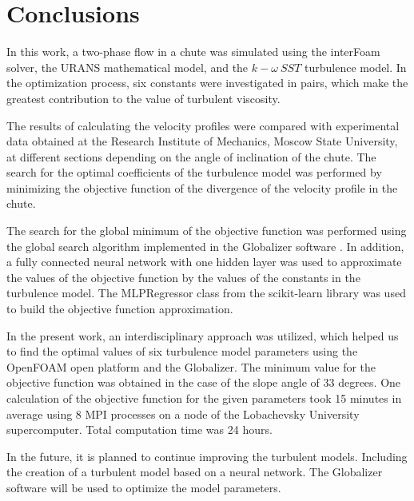 \documentclass[mathematics,article,submit,pdftex,moreauthors]{Definitions/mdpi}
\begin{document}
\section{Conclusions}

In this work, a two-phase flow in a chute was simulated using the interFoam solver, the URANS mathematical model, and the $k-\omega\ SST$ turbulence model. In the optimization process, six constants were investigated in pairs, which make the greatest contribution to the value of turbulent viscosity.

The results of calculating the velocity profiles were compared with experimental data obtained at the Research Institute of Mechanics, Moscow State University, at different sections depending on the angle of inclination of the chute. The search for the optimal coefficients of the turbulence model was performed by minimizing the objective function of the divergence of the velocity profile in the chute. %

The search for the global minimum of the objective function was performed using the global search algorithm implemented in the Globalizer software \cite{globalizerSystem}. In addition, a fully connected neural network with one hidden layer was used to approximate the values of the objective function by the values of the constants in the turbulence model. The MLPRegressor class from the scikit-learn library was used to build the objective function approximation. 

In the present work, an interdisciplinary approach was utilized, which helped us to find the optimal values of six turbulence model parameters using the OpenFOAM open platform and the Globalizer. The minimum value for the objective function was obtained in the case of the slope angle of 33 degrees. One calculation of the objective function for the given parameters took 15 minutes in average using 8 MPI processes on a node of the Lobachevsky University supercomputer. Total computation time was 24 hours.  

In the future, it is planned to continue improving the turbulent models. Including the creation of a turbulent model based on a neural network. The Globalizer software will be used to optimize the model parameters.

\vspace{6pt} 

\end{document}
